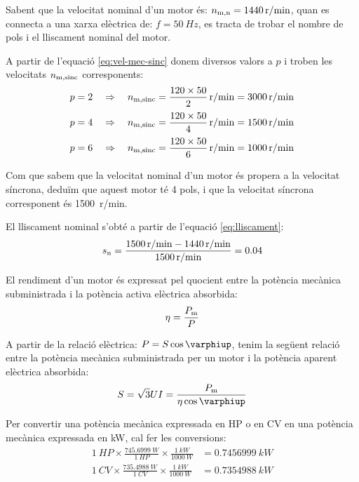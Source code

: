 	
\begin{exemple}[\MotorNombrePols{}]
	\addcontentsxms{\MotorNombrePols}
    Sabent que la velocitat nominal d'un motor és: $n_\mathrm{m,n} = \qty{1440}{r/min}$, quan es connecta a una xarxa elèctrica de: $f = \qty{50}{Hz}$,  es tracta de trobar el nombre de pols i el lliscament nominal del motor.

    A partir de l'equació \eqref{eq:vel-mec-sinc} donem diversos valors a $p$ i troben les velocitats $n_\mathrm{m,sinc}$ corresponents:
    \begin{align*}
      p = 2 \quad  &\Rightarrow \quad n\ped{m,sinc} = \frac{120 \times 50}{2} \, \unit{r/min} = \qty{3000}{r/min}\\[0.5ex]
      p = 4 \quad  &\Rightarrow \quad n\ped{m,sinc} = \frac{120 \times 50}{4} \, \unit{r/min} = \qty{1500}{r/min}\\[0.5ex]
      p = 6 \quad  &\Rightarrow \quad n\ped{m,sinc} = \frac{120 \times 50}{6} \, \unit{r/min} = \qty{1000}{r/min}
    \end{align*}

    Com que sabem que la velocitat nominal d'un motor és propera a la velocitat síncrona, deduïm que aquest motor té 4 pols, i que la velocitat síncrona corresponent és \qty{1500}{r/min}.

    El lliscament nominal s'obté a partir de l'equació \eqref{eq:lliscament}:
    \[
      s_\mathrm{n} = \frac{\qty{1500}{r/min} - \qty{1440}{r/min}}{\qty{1500}{r/min}} = \num{0,04}
    \]
\end{exemple}

El rendiment d'un motor és expressat pel quocient entre la potència mecànica subministrada i la potència activa elèctrica absorbida:
\begin{equation}\index{rendiment}\index{potència mecànica}
    \eta = \frac{P\ped{m}}{P}
\end{equation}

A partir de la relació elèctrica: $P = S \cos\varphiup$, tenim la següent relació entre la potència mecànica subministrada per un motor i la potència aparent elèctrica absorbida:
\begin{equation}
    S = \sqrt{3} U I = \frac{P\ped{m}}{\eta \cos\varphiup}\label{eq:mot-S-Pm}
\end{equation}

Per  convertir una potència mecànica expressada en HP o en CV en una  potència mecànica expressada en kW, cal  fer les conversions:
\begin{subequations}
\begin{align}
  \qty{1}{HP} \times \frac{\qty{745,6999}{W}}{\qty{1}{HP}} \times \frac{\qty{1}{kW}}{\qty{1000}{W}} &= \qty{0,7456999}{kW} \\[1ex]
  \qty{1}{CV} \times \frac{\qty{735,4988}{W}}{\qty{1}{CV}} \times \frac{\qty{1}{kW}}{\qty{1000}{W}} &= \qty{0,7354988}{kW}
\end{align}
\end{subequations}

